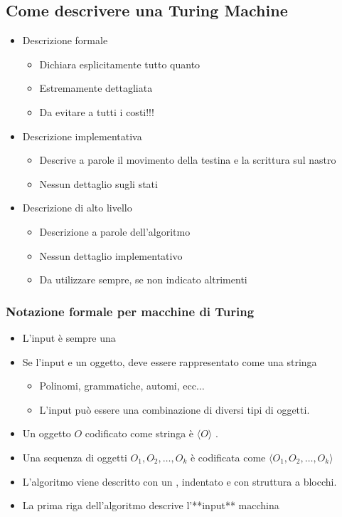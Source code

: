 \subsection{Come descrivere una Turing Machine}
\begin{itemize}
	\item Descrizione formale
		\begin{itemize}
			\item Dichiara esplicitamente tutto quanto
			\item Estremamente dettagliata
			\item Da evitare a tutti i costi!!!
		\end{itemize}
	\item Descrizione implementativa
		\begin{itemize}
			\item Descrive a parole il movimento della testina e la scrittura sul nastro
			\item Nessun dettaglio sugli stati 
		\end{itemize}
	\item  Descrizione di alto livello
		\begin{itemize}
			\item Descrizione a parole dell'algoritmo
			\item Nessun dettaglio implementativo 
			\item Da utilizzare sempre, se non indicato altrimenti
		\end{itemize}
\end{itemize}

\subsubsection{Notazione formale per macchine di Turing}
\begin{itemize}
	\item L'input è sempre una  
	\item Se l'input e un oggetto, deve essere rappresentato come una stringa
		\begin{itemize}
			\item  Polinomi, grammatiche, automi, ecc$\dots$ 
			\item L'input può essere una combinazione di diversi tipi di oggetti.
		\end{itemize}
	\item Un oggetto $O$ codificato come stringa è $\langle O\rangle$ .
	\item Una sequenza di oggetti $O_1, O_2,\dots, O_k$ è codificata come $\langle O_1, O_2,\dots, O_k\rangle$ 
	\item L'algoritmo viene descritto con un , indentato e con struttura a blocchi. 
	\item La prima riga dell'algoritmo descrive l'**input** macchina
\end{itemize}

